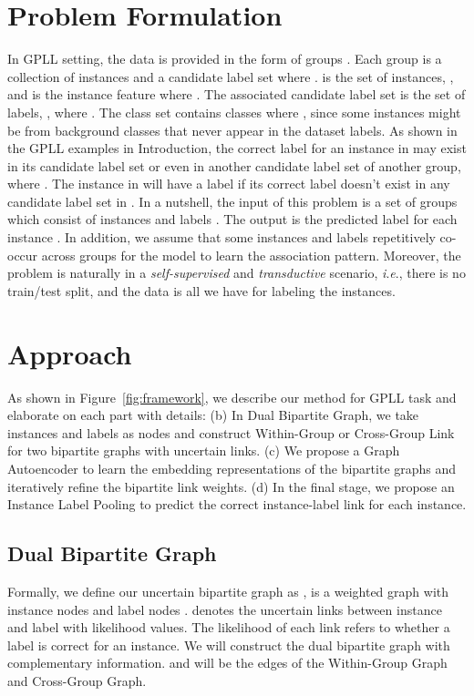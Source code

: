 \documentclass[letterpaper]{article} \usepackage{aaai20}  \usepackage{times}  \usepackage{helvet} \usepackage{courier}  \usepackage[hyphens]{url}  \usepackage{graphicx} \urlstyle{rm} \def\UrlFont{\rm}  \frenchspacing  \setlength{\pdfpagewidth}{8.5in}  \setlength{\pdfpageheight}{11in}  \frenchspacing
\newcommand{\ie}{\textit{i}.\textit{e}.}
\begin{document}
\section{Problem Formulation}


In GPLL setting, the data is provided in the form of   groups . Each group  is a collection of instances and a candidate label set where .  is the set of  instances, , and  is the instance feature where . The associated candidate label set  is the set of  labels, ,  where .
The class set  contains  classes where , since some instances might be from background classes that never appear in the dataset labels. As shown in the GPLL examples in Introduction, the correct label for an instance in  may exist in its candidate label set  or even in another candidate label set  of another group, where . The instance in  will have a  label if its correct label doesn't exist in any candidate label set  in .
In a nutshell, the input of this problem is a set of groups which consist of instances and labels . The output is the predicted label  for each instance . In addition, we assume that some instances and labels repetitively co-occur across groups for the model to learn the association pattern. Moreover, the problem is naturally in a \emph{self-supervised} and \emph{transductive} scenario, \ie, there is no train/test split, and the data  is all we have for labeling the instances.




\section{Approach}




As shown in Figure~\ref{fig:framework}, we describe our method for GPLL task and elaborate on each part with details: (b) In Dual Bipartite Graph, we take instances and labels as nodes and construct Within-Group or Cross-Group Link for two bipartite graphs with uncertain links. (c) We propose a Graph Autoencoder to learn the embedding representations of the bipartite graphs and iteratively refine the bipartite link weights. 
(d) In the final stage, we propose an Instance Label Pooling to predict the correct instance-label link for each instance.

\subsection{Dual Bipartite Graph}  \label{sec:subgraphconstruction}
 Formally, we define our uncertain bipartite graph as ,  is a weighted graph with instance nodes  and label nodes . 
   denotes the uncertain links between instance  and label  with likelihood values. The likelihood of each link refers to whether a label is correct for an instance. We will construct the dual bipartite graph  with complementary information.  and  will be the edges of the Within-Group Graph and Cross-Group Graph.
  
\end{document}
